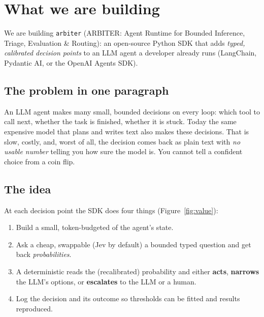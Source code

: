 \chapter{What we are building}
\label{ch:building}

We are building \texttt{arbiter} (ARBITER: Agent Runtime for Bounded Inference, Triage,
Evaluation \& Routing): an open-source Python SDK that adds \emph{typed, calibrated
decision points} to an LLM agent a developer already runs (LangChain, Pydantic AI, or the
OpenAI Agents SDK).

\section{The problem in one paragraph}

An LLM agent makes many small, bounded decisions on every loop: which tool to call next,
whether the task is finished, whether it is stuck. Today the same expensive model that
plans and writes text also makes these decisions. That is slow, costly, and, worst of all,
the decision comes back as plain text with \emph{no usable number} telling you how sure the
model is. You cannot tell a confident choice from a coin flip.

\section{The idea}

At each decision point the SDK does four things (Figure~\ref{fig:value}):

\begin{enumerate}[itemsep=2pt]
  \item Build a small, token-budgeted  of the agent's state.
  \item Ask a cheap, swappable  (Jev by default) a bounded typed question
        and get back \emph{probabilities}.
  \item A deterministic  reads the (recalibrated) probability and either
        \textbf{acts}, \textbf{narrows} the LLM's options, or \textbf{escalates} to the
        LLM or a human.
  \item Log the decision and its outcome so thresholds can be fitted and results reproduced.
\end{enumerate}

